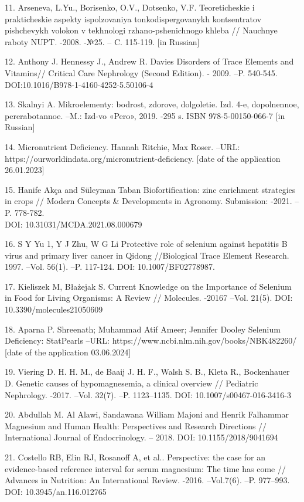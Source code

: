 \begin{noparindent}
11. Arsen\textquotesingle eva, L.Yu., Borisenko, O.V., Dotsenko, V.F.
Teoreticheskie i prakticheskie aspekty ispol\textquotesingle zovaniya
tonkodispergovanykh kontsentratov pishchevykh volokon v tekhnologi
rzhano-pshenichnogo khleba // Nauchnye raboty NUPT. -2008. -№25. -- C.
115-119. {[}in Russian{]}

12. Anthony J. Hennessy J., Andrew R. Davies Disorders of Trace Elements
and Vitamins// Critical Care Nephrology (Second Edition). - 2009. --P.
540-545. DOI:10.1016/B978-1-4160-4252-5.50106-4

13. Skal\textquotesingle nyi A. Mikroelementy: bodrost\textquotesingle,
zdorov\textquotesingle e, dolgoletie. Izd. 4-e, dopolnennoe,
pererabotannoe. --M.: Izd-vo «Pero», 2019. -295 s. ISBN
978-5-00150-066-7 {[}in Russian{]}

14. Micronutrient Deficiency. Hannah Ritchie, Max Roser. --URL:
https://ourworldindata.org/micronutrient-deficiency. {[}date of the
application 26.01.2023{]}

15. Hanife Akça and Süleyman Taban Biofortification: zinc enrichment
strategies in crops // Modern Concepts \& Developments in Agronomy.
Submission: -2021. --P. 778-782.\\ DOI: 10.31031/MCDA.2021.08.000679

16. S Y Yu 1, Y J Zhu, W G Li Protective role of selenium against
hepatitis B virus and primary liver cancer in Qidong //Biological Trace
Element Research. 1997. --Vol. 56(1). --P. 117-124. DOI:
10.1007/BF02778987.

17. Kieliszek M, Błażejak S. Current Knowledge on the Importance of
Selenium in Food for Living Organisms: A Review // Molecules. -20167
--Vol. 21(5). DOI: 10.3390/molecules21050609

18. Aparna P. Shreenath; Muhammad Atif Ameer; Jennifer Dooley Selenium
Deficiency: StatPearls --URL:
https://www.ncbi.nlm.nih.gov/books/NBK482260/ {[}date of the application
03.06.2024{]}

19. Viering D. H. H. M., de Baaij J. H. F., Walsh S. B., Kleta R.,
Bockenhauer D. Genetic causes of hypomagnesemia, a clinical overview //
Pediatric Nephrology. -2017. --Vol. 32(7). --P. 1123--1135. DOI:
10.1007/s00467-016-3416-3

20. Abdullah M. Al Alawi, Sandawana William Majoni and Henrik Falhammar
Magnesium and Human Health: Perspectives and Research Directions //
International Journal of Endocrinology. -- 2018. DOI:
10.1155/2018/9041694

21. Costello RB, Elin RJ, Rosanoff A, et al.. Perspective: the case for
an evidence-based reference interval for serum magnesium: The time has
come // Advances in Nutrition: An International Review. -2016.
--Vol.7(6). --P. 977--993. DOI: 10.3945/an.116.012765


\end{noparindent}
